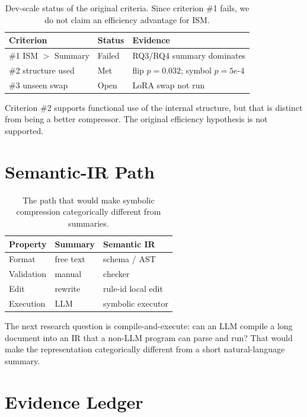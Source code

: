 \documentclass[10pt,twocolumn]{article}
\newcommand{\ism}{\textsc{ISM}}
\begin{document}
\begin{table}[t]
\centering
\scriptsize
\begin{tabular}{lll}
\toprule
Criterion & Status & Evidence \\
\midrule
\#1 \ism{} $>$ Summary & Failed & RQ3/RQ4 summary dominates \\
\#2 structure used & Met & flip $p=0.032$; symbol $p=5e$-$4$ \\
\#3 unseen swap & Open & LoRA swap not run \\
\bottomrule
\end{tabular}
\caption{Dev-scale status of the original criteria.  Since criterion \#1 fails,
we do not claim an efficiency advantage for \ism{}.}
\label{tab:status}
\end{table}

Criterion \#2 supports functional use of the internal structure, but that is
distinct from being a better compressor.  The original efficiency hypothesis is
not supported.

\section{Semantic-IR Path}

\begin{table}[t]
\centering
\scriptsize
\begin{tabular}{lll}
\toprule
Property & Summary & Semantic IR \\
\midrule
Format & free text & schema / AST \\
Validation & manual & checker \\
Edit & rewrite & rule-id local edit \\
Execution & LLM & symbolic executor \\
\bottomrule
\end{tabular}
\caption{The path that would make symbolic compression categorically different
from summaries.}
\label{tab:ir}
\end{table}

The next research question is compile-and-execute: can an LLM compile a long
document into an IR that a non-LLM program can parse and run?  That would make
the representation categorically different from a short natural-language
summary.

\section{Evidence Ledger}
\end{document}
